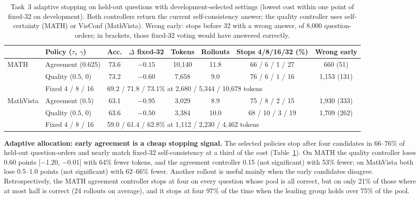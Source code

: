 \documentclass{article}
\newcommand{\ci}[2]{{\scriptsize[#1, #2]}}
\begin{document}
\begin{table}[t]
\centering
\caption{Task~3 adaptive stopping on held-out questions with development-selected settings (lowest cost within one point of fixed-32 on development). Both controllers return the current self-consistency answer; the quality controller uses self-certainty (MATH) or VisConf (MathVista). Wrong early: stops before 32 with a wrong answer, of 8,000 question-orders; in brackets, those fixed-32 voting would have answered correctly.}
\label{tab:adapt}
\small
\setlength{\tabcolsep}{3pt}
\begin{tabular}{llcccccc}
\toprule
 & Policy ($\tau$, $\gamma$) & Acc. & $\Delta$ fixed-32 & Tokens & Rollouts & Stops 4/8/16/32 (\%) & Wrong early\\
\midrule
\multirow{3}{*}{MATH} & Agreement (0.625) & 73.6 & $-0.15$ & 10,140 & 11.8 & 66 / 6 / 1 / 27 & 660 (51)\\
 & Quality (0.5, 0) & 73.2 & $-0.60$ & 7,658 & 9.0 & 76 / 6 / 1 / 16 & 1,153 (131)\\
 & Fixed 4 / 8 / 16 & \multicolumn{5}{l}{69.2 / 71.8 / 73.1\% at 2,680 / 5,344 / 10,678 tokens} & \\
\midrule
\multirow{3}{*}{MathVista} & Agreement (0.5) & 63.1 & $-0.95$ & 3,029 & 8.9 & 75 / 8 / 2 / 15 & 1,930 (333)\\
 & Quality (0.5, 0) & 63.6 & $-0.50$ & 3,384 & 10.0 & 68 / 10 / 3 / 19 & 1,709 (262)\\
 & Fixed 4 / 8 / 16 & \multicolumn{5}{l}{59.0 / 61.4 / 62.8\% at 1,112 / 2,230 / 4,462 tokens} & \\
\bottomrule
\end{tabular}
\end{table}

\textbf{Adaptive allocation: early agreement is a cheap stopping signal.} The selected policies stop after four candidates in 66--76\% of held-out question-orders and nearly match fixed-32 self-consistency at a third of the cost (Table~\ref{tab:adapt}). On MATH the quality controller loses 0.60 points \ci{$-$1.20}{$-$0.01} with 64\% fewer tokens, and the agreement controller 0.15 (not significant) with 53\% fewer; on MathVista both lose 0.5--1.0 points (not significant) with 62--66\% fewer. Another rollout is useful mainly when the early candidates disagree. Retrospectively, the MATH agreement controller stops at four on every question whose pool is all correct, but on only 21\% of those where at most half is correct (24 rollouts on average), and it stops at four 97\% of the time when the leading group holds over 75\% of the pool.
\end{document}
